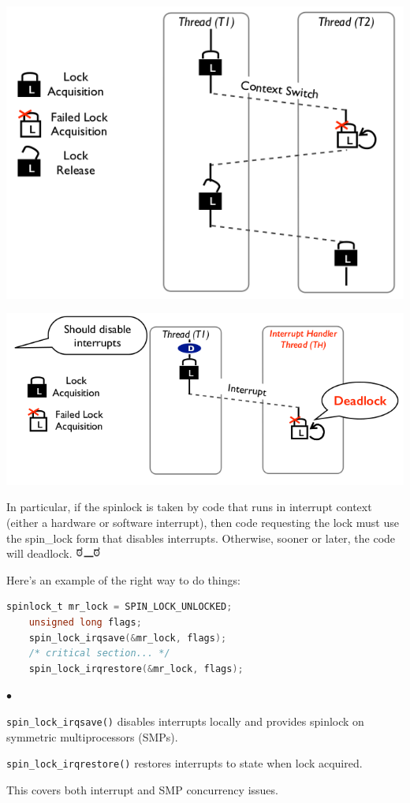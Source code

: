 \documentclass[11pt]{article}
\newcommand{\squishlist}{
 \begin{list}{$\bullet$}
  { \setlength{\itemsep}{0pt}
     \setlength{\parsep}{3pt}
     \setlength{\topsep}{3pt}
     \setlength{\partopsep}{0pt}
     \setlength{\leftmargin}{1.5em}
     \setlength{\labelwidth}{1em}
     \setlength{\labelsep}{0.5em} } }
\newcommand{\squishend}{
  \end{list}  }
\begin{document}
\begin{center}
\includegraphics[width=.6\textwidth]{L10/lock-acq1}

\includegraphics[width=.8\textwidth]{L10/lock-acq2}
\end{center}

In particular, if the spinlock is taken by code that runs in interrupt context (either a hardware or software interrupt), then
code requesting the lock must use the spin\_lock form that disables interrupts.
Otherwise, sooner or later, the code will deadlock. \includegraphics[height=1em]{L10/look_of_disapproval}

Here's an example of the right way to do things:
\begin{lstlisting}[language=C]
    spinlock_t mr_lock = SPIN_LOCK_UNLOCKED;
    unsigned long flags;
    spin_lock_irqsave(&mr_lock, flags);
    /* critical section... */
    spin_lock_irqrestore(&mr_lock, flags);
\end{lstlisting}

\squishlist
\item {\tt spin\_lock\_irqsave()} disables interrupts locally and provides spinlock on symmetric multiprocessors (SMPs).
\item {\tt spin\_lock\_irqrestore()} restores interrupts to state when lock acquired.
\squishend

This covers both interrupt and SMP concurrency issues.




 
\end{document}
